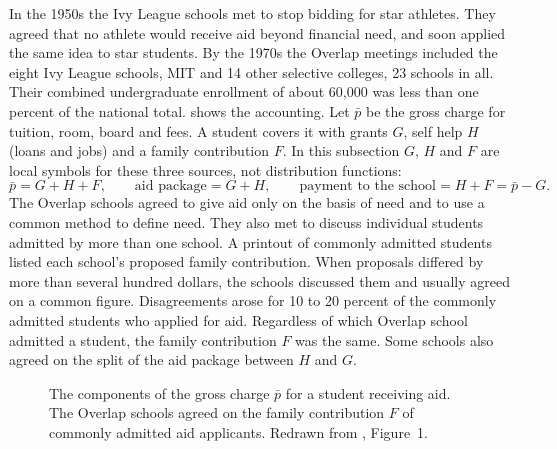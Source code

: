 In the 1950s the Ivy League schools met to stop bidding for star athletes. They agreed that no athlete would
receive aid beyond financial need, and soon applied the same idea to star students. By the 1970s the Overlap
meetings included the eight Ivy League schools, MIT and 14 other selective colleges, 23 schools in all. Their
combined undergraduate enrollment of about 60,000 was less than one percent of the national total.
 shows the accounting. Let $\bar p$ be the gross charge for tuition, room, board and fees. A
student covers it with grants $G$, self help $H$ (loans and jobs) and a family contribution $F$. In this subsection
$G$, $H$ and $F$ are local symbols for these three sources, not distribution functions:
\begin{equation}\label{eq:13-cbe-accounting}
  \bar p = G + H + F, \qquad \text{aid package} = G + H, \qquad \text{payment to the school} = H + F = \bar p - G .
\end{equation}
The Overlap schools agreed to give aid only on the basis of need and to use a common method to define need. They
also met to discuss individual students admitted by more than one school. A printout of commonly admitted students
listed each school's proposed family contribution. When proposals differed by more than several hundred dollars,
the schools discussed them and usually agreed on a common figure. Disagreements arose for 10 to 20 percent of the
commonly admitted students who applied for aid. Regardless of which Overlap school admitted a student, the family
contribution $F$ was the same. Some schools also agreed on the split of the aid package between $H$ and $G$.

\begin{figure}[htbp]
\centering
{}
\caption{The components of the gross charge $\bar p$ for a student receiving aid. The Overlap schools agreed on the
family contribution $F$ of commonly admitted aid applicants. Redrawn from \citet{CarltonBambergerEpstein1995},
Figure~1.}\label{fig:13-cbe-aid}
\end{figure}

